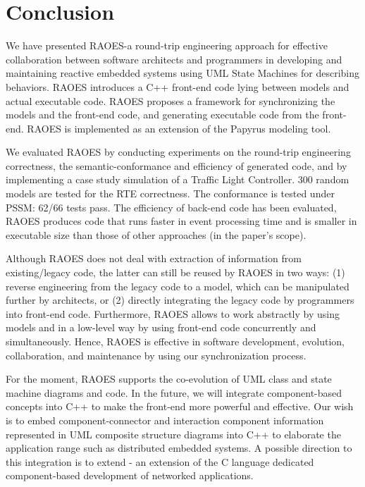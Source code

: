 \section{Conclusion}
\label{sec:conclusion}
We have presented RAOES-a round-trip engineering approach for effective collaboration between software architects and programmers in developing and maintaining reactive embedded systems using UML State Machines for describing behaviors. 
RAOES introduces a C++ front-end code lying between models and actual executable code.
RAOES proposes a framework for synchronizing the models and the front-end code, and generating executable code from the front-end.
RAOES is implemented as an extension of the Papyrus modeling tool.

We evaluated RAOES by conducting experiments on the round-trip engineering correctness, the semantic-conformance and efficiency of generated code, and by implementing a case study simulation of a Traffic Light Controller.
300 random models are tested for the RTE correctness.
The conformance is tested under PSSM: 62/66 tests pass.
The efficiency of back-end code has been evaluated, RAOES produces code that runs faster in event processing time and is smaller in executable size than those of other approaches (in the paper's scope).

Although RAOES does not deal with extraction of information from existing/legacy code, the latter can still be reused by RAOES in two ways: (1) reverse engineering from the legacy code to a model, which can be manipulated further by architects, or (2) directly integrating the legacy code by programmers into front-end code. 
Furthermore, RAOES allows to work abstractly by using models and in a low-level way by using front-end code concurrently and simultaneously. Hence, RAOES is effective in software development, evolution, collaboration, and maintenance by using our synchronization process.


For the moment, RAOES supports the co-evolution of UML class and state machine diagrams and code.
In the future, we will integrate component-based concepts into C++ to make the front-end more powerful and effective.
Our wish is to embed component-connector and interaction component information represented in UML composite structure diagrams into C++ to elaborate the application range such as distributed embedded systems.
A possible direction to this integration is to extend  \cite{gay2003nesc} - an extension of the C language dedicated component-based development of networked applications.
 